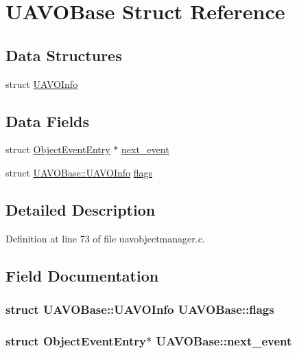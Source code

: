 \hypertarget{struct_u_a_v_o_base}{\section{\-U\-A\-V\-O\-Base \-Struct \-Reference}
\label{struct_u_a_v_o_base}
}
\subsection*{\-Data \-Structures}
\begin{DoxyCompactItemize}
\item 
struct \hyperlink{struct_u_a_v_o_base_1_1_u_a_v_o_info}{\-U\-A\-V\-O\-Info}
\end{DoxyCompactItemize}
\subsection*{\-Data \-Fields}
\begin{DoxyCompactItemize}
\item 
struct \hyperlink{struct_object_event_entry}{\-Object\-Event\-Entry} $\ast$ \hyperlink{struct_u_a_v_o_base_aa0d6ea1fcd5ae56953e8dd7f244dd988}{next\-\_\-event}
\item 
struct \hyperlink{struct_u_a_v_o_base_1_1_u_a_v_o_info}{\-U\-A\-V\-O\-Base\-::\-U\-A\-V\-O\-Info} \hyperlink{struct_u_a_v_o_base_a613d564f9ee891c00dba4e3fe6277193}{flags}
\end{DoxyCompactItemize}


\subsection{\-Detailed \-Description}


\-Definition at line 73 of file uavobjectmanager.\-c.



\subsection{\-Field \-Documentation}
\hypertarget{struct_u_a_v_o_base_a613d564f9ee891c00dba4e3fe6277193}{
\subsubsection[{flags}]{\setlength{\rightskip}{0pt plus 5cm}struct {\bf \-U\-A\-V\-O\-Base\-::\-U\-A\-V\-O\-Info}  {\bf \-U\-A\-V\-O\-Base\-::flags}}}\label{struct_u_a_v_o_base_a613d564f9ee891c00dba4e3fe6277193}
\hypertarget{struct_u_a_v_o_base_aa0d6ea1fcd5ae56953e8dd7f244dd988}{
\subsubsection[{next\-\_\-event}]{\setlength{\rightskip}{0pt plus 5cm}struct {\bf \-Object\-Event\-Entry}$\ast$ {\bf \-U\-A\-V\-O\-Base\-::next\-\_\-event}}}\label{struct_u_a_v_o_base_aa0d6ea1fcd5ae56953e8dd7f244dd988}


